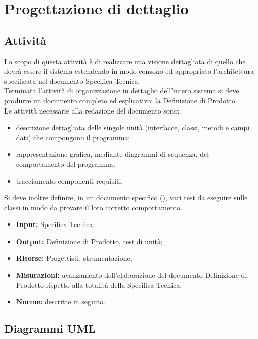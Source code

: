 \section{Progettazione di dettaglio} {
\subsection{Attività}{
Lo scopo di questa attività è di realizzare una visione dettagliata di quello che dovrà essere il sistema estendendo in modo consono ed appropriato l'architettura specificata nel documento Specifica Tecnica.\\
Terminata l'attività di organizzazione in dettaglio dell'intero sistema si deve produrre un documento completo ed esplicativo: la Definizione di Prodotto.\\
Le attività necessarie alla redazione del documento  sono:
\begin{itemize}
	\item descrizione dettagliata delle singole unità (interfacce, classi, metodi e campi dati) che compongono il programma;
	\item rappresentazione grafica, mediante diagrammi di sequenza, del comportamento del programma;
	\item tracciamento componenti-requisiti.
\end{itemize}
Si deve inoltre definire, in un documento specifico (\textit{\PianoDiQualifica}), vari test da eseguire sulle classi in modo da provare il loro corretto comportamento.
\begin{itemize}
	\item []{\textbf{Input:} Specifica Tecnica;}
	\item []{\textbf{Output:} Definizione di Prodotto, test di unità;}
	\item []{\textbf{Risorse:} Progettisti, strumentazione;}
	\item []{\textbf{Misurazioni:} avanzamento dell'elaborazione del documento Definizione di Prodotto rispetto alla totalità della Specifica Tecnica;}
	\item []{\textbf{Norme:} descritte in seguito.}
\end{itemize}
}

\subsection{Diagrammi UML}{
}}
